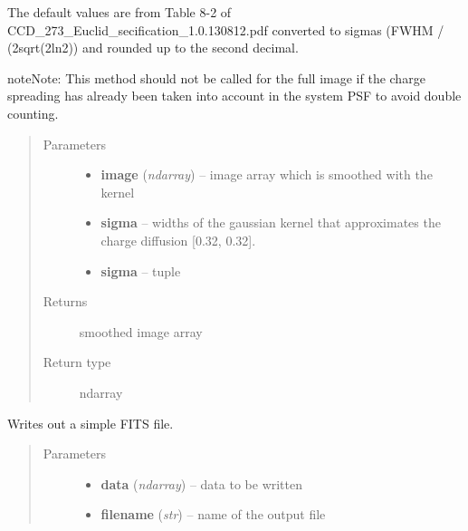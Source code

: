 \documentclass[a4paper,11pt,english]{sphinxmanual}
\begin{document}
\begin{fulllineitems}
\begin{fulllineitems}
The default values are from Table 8-2 of CCD\_273\_Euclid\_secification\_1.0.130812.pdf converted
to sigmas (FWHM / (2sqrt(2ln2)) and rounded up to the second decimal.

\begin{notice}{note}{Note:}
This method should not be called for the full image if the charge spreading
has already been taken into account in the system PSF to avoid double counting.
\end{notice}
\begin{quote}\begin{description}
\item[{Parameters}] \leavevmode\begin{itemize}
\item {} 
\textbf{image} (\emph{ndarray}) -- image array which is smoothed with the kernel

\item {} 
\textbf{sigma} -- widths of the gaussian kernel that approximates the charge diffusion {[}0.32, 0.32{]}.

\item {} 
\textbf{sigma} -- tuple

\end{itemize}

\item[{Returns}] \leavevmode
smoothed image array

\item[{Return type}] \leavevmode
ndarray

\end{description}\end{quote}

\end{fulllineitems}


\begin{fulllineitems}
\label{simulator:simulator.simulator.VISsimulator.writeFITSfile}
Writes out a simple FITS file.
\begin{quote}\begin{description}
\item[{Parameters}] \leavevmode\begin{itemize}
\item {} 
\textbf{data} (\emph{ndarray}) -- data to be written

\item {} 
\textbf{filename} (\emph{str}) -- name of the output file


\end{itemize}
\end{description}
\end{quote}
\end{fulllineitems}
\end{fulllineitems}
\end{document}
